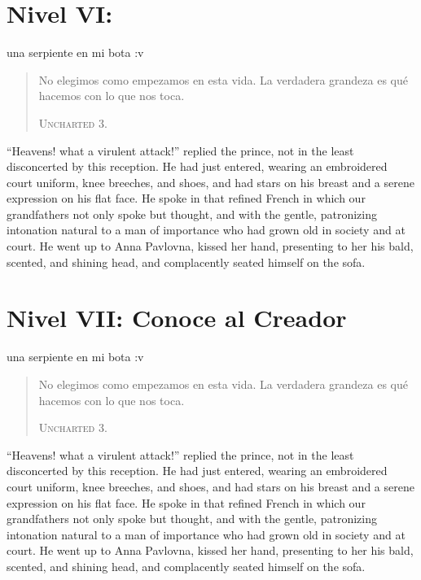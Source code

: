 \chapter*{Nivel VI: } 

 una serpiente en mi bota :v 

\begin{quote} \calli No elegimos como empezamos en esta vida. La verdadera grandeza es qué hacemos con lo que nos toca. 

\textsc{Uncharted 3.}
\end{quote}

``Heavens! what a virulent attack!'' replied the prince, not in
the least disconcerted by this reception. He had just entered,
wearing an embroidered court uniform, knee breeches, and shoes,
and had stars on his breast and a serene expression on his flat
face. He spoke in that refined French in which our grandfathers
not only spoke but thought, and with the gentle, patronizing
intonation natural to a man of importance who had grown old in
society and at court. He went up to Anna Pavlovna, kissed her
hand, presenting to her his bald, scented, and shining head, and
complacently seated himself on the sofa.



\chapter*{Nivel VII: Conoce al Creador} 

 una serpiente en mi bota :v 

\begin{quote} \calli No elegimos como empezamos en esta vida. La verdadera grandeza es qué hacemos con lo que nos toca. 

\textsc{Uncharted 3.}
\end{quote}

``Heavens! what a virulent attack!'' replied the prince, not in
the least disconcerted by this reception. He had just entered,
wearing an embroidered court uniform, knee breeches, and shoes,
and had stars on his breast and a serene expression on his flat
face. He spoke in that refined French in which our grandfathers
not only spoke but thought, and with the gentle, patronizing
intonation natural to a man of importance who had grown old in
society and at court. He went up to Anna Pavlovna, kissed her
hand, presenting to her his bald, scented, and shining head, and
complacently seated himself on the sofa.
